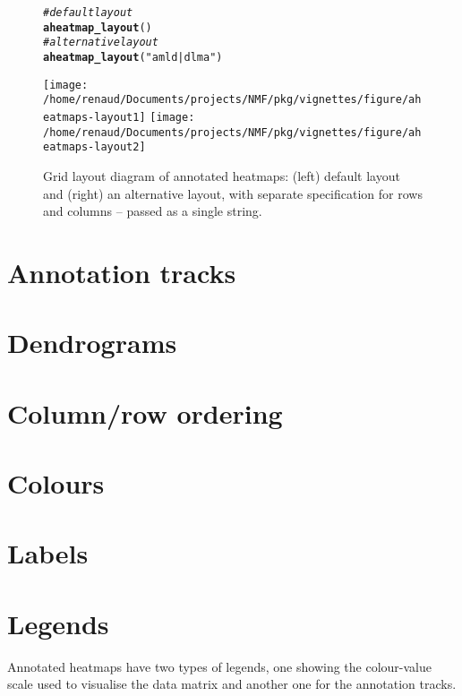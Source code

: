 \documentclass[a4paper]{article}\usepackage[]{graphicx}\usepackage[]{color}
\makeatletter
\newcommand{\hlstr}[1]{\textcolor[rgb]{0.192,0.494,0.8}{#1}}%
\newcommand{\hlcom}[1]{\textcolor[rgb]{0.678,0.584,0.686}{\textit{#1}}}%
\newcommand{\hlstd}[1]{\textcolor[rgb]{0.345,0.345,0.345}{#1}}%
\newcommand{\hlkwd}[1]{\textcolor[rgb]{0.737,0.353,0.396}{\textbf{#1}}}%
\newenvironment{kframe}{%
 \def\at@end@of@kframe{}%
 \ifinner\ifhmode%
  \def\at@end@of@kframe{\end{minipage}}%
  \begin{minipage}{\columnwidth}%
 \fi\fi%
 \def\FrameCommand##1{\hskip\@totalleftmargin \hskip-\fboxsep
 \colorbox{shadecolor}{##1}\hskip-\fboxsep
     \hskip-\linewidth \hskip-\@totalleftmargin \hskip\columnwidth}%
 \MakeFramed {\advance\hsize-\width
   \@totalleftmargin\z@ \linewidth\hsize
   \@setminipage}}%
 {\par\unskip\endMakeFramed%
 \at@end@of@kframe}
\newenvironment{knitrout}{}{} %
\makeatother
\begin{document}
\begin{figure}[!htpb]
\begin{knitrout}\small
{}\color{fgcolor}\begin{kframe}
\begin{alltt}
\hlcom{# default layout}
\hlkwd{aheatmap_layout}\hlstd{()}
\hlcom{# alternative layout}
\hlkwd{aheatmap_layout}\hlstd{(}\hlstr{"amld | dlma"}\hlstd{)}
\end{alltt}
\end{kframe}
\texttt{[image: /home/renaud/Documents/projects/NMF/pkg/vignettes/figure/aheatmaps-layout1]} 
\texttt{[image: /home/renaud/Documents/projects/NMF/pkg/vignettes/figure/aheatmaps-layout2]} 

\end{knitrout}

\caption{Grid layout diagram of annotated heatmaps: (left) default layout and
(right) an alternative layout, with separate specification for rows
and columns -- passed as a single string.}
\label{fig:layout}
\end{figure}

\section{Annotation tracks}
\section{Dendrograms}
\section{Column/row ordering}
\section{Colours}
\section{Labels}

\section{Legends}
Annotated heatmaps have two types of legends, one showing the colour-value scale
used to visualise the data matrix and another one for the annotation tracks.
\end{document}
